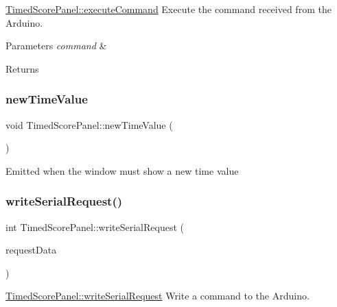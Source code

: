 \mbox{\hyperlink{classTimedScorePanel_a0b1e7a7596b1e059571c65ce6046c343}{Timed\+Score\+Panel\+::execute\+Command}} Execute the command received from the Arduino. 


\begin{DoxyParams}{Parameters}
{\em command} & \\
\hline
\end{DoxyParams}
\begin{DoxyReturn}{Returns}

\end{DoxyReturn}
\mbox{\label{classTimedScorePanel_a46c1848c7cdcff881036d476a78da36f}} 
\subsubsection{\texorpdfstring{new\+Time\+Value}{newTimeValue}}
{\footnotesize\ttfamily void Timed\+Score\+Panel\+::new\+Time\+Value (\begin{DoxyParamCaption}\item[{Q\+String}]{ }\end{DoxyParamCaption})\hspace{0.3cm}{\ttfamily [signal]}}

Emitted when the window must show a new time value \mbox{\label{classTimedScorePanel_a4e817b212121e6970b2af49c8e7c47ca}} 
\subsubsection{\texorpdfstring{write\+Serial\+Request()}{writeSerialRequest()}}
{\footnotesize\ttfamily int Timed\+Score\+Panel\+::write\+Serial\+Request (\begin{DoxyParamCaption}\item[{Q\+Byte\+Array}]{request\+Data }\end{DoxyParamCaption})\hspace{0.3cm}{\ttfamily [protected]}}



\mbox{\hyperlink{classTimedScorePanel_a4e817b212121e6970b2af49c8e7c47ca}{Timed\+Score\+Panel\+::write\+Serial\+Request}} Write a command to the Arduino. 


